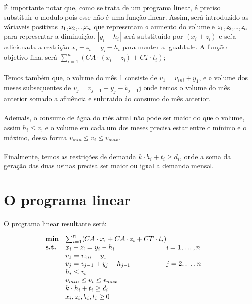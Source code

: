 \documentclass{article}
\begin{document}
\paragraph{} É importante notar que, como se trata de um programa linear, é preciso substituir o modulo pois esse não é uma função linear. Assim, será introduzido as váriaveis positivas $\emph{x}_1$,$\emph{x}_2$,\dots,$\emph{x}_n$ que representam o aumento do volume e $\emph{z}_1$,$\emph{z}_2$,\dots,$\emph{z}_n$ para representar a diminuição. \emph{$| y_{i} - h_{i} |$} será substituído por \emph{$(x_i + z_i)$} e seŕa adicionada a restrição \emph{$x_i - z_i = y_i - h_i$} para manter a igualdade. A função objetivo final será \emph{$\sum_{i=1}^{n} (CA \cdot (x_i + z_i) + CT \cdot t_{i})$};
\paragraph{} Temos também que, o volume do mês 1 consiste de \emph{$v_1 = v_{ini} + y_1$}, e o volume dos meses subsequentes de \emph{$v_j = v_{j-1} + y_j - h_{j-1}$}j onde temos o volume do mês anterior somado a afluência e subtraido do consumo do mês anterior. 
\paragraph{} Ademais, o consumo de água do mês atual não pode ser maior do que o volume, assim \emph{$h_i \le v_i$} e o volume em cada um dos meses precisa estar entre o mínimo e o máximo, dessa forma \emph{$v_{min} \le v_i \le v_{max}$}.
\paragraph{} Finalmente, temos as restrições de demanda \emph{$k \cdot h_i + t_i \ge d_i $}, onde a soma da geração das duas usinas precisa ser maior ou igual a demanda mensal.

\section{O programa linear}
\paragraph{} O programa linear resultante será:

\begin{equation*}
    \begin{array}{ll@{}ll}
        \textbf{min}  & \sum_{i=1}^{n} (CA \cdot x_i + CA \cdot z_i + CT \cdot t_{i}) &\\
        \textbf{s.t.} & x_i - z_i = y_i - h_i &i=1 ,\dots, n\\
                      & v_1 = v_{ini} + y_1 &\\ 
                      & v_j = v_{j-1} + y_j - h_{j-1} &j=2 ,\dots, n&\\
                      & h_i \le v_i &\\
                      & v_{min} \le v_i \le v_{max} &\\
                      & k \cdot h_i + t_i \ge d_i &\\
                      & x_i,z_i,h_i,t_i \ge 0
    \end{array}
\end{equation*}
\end{document}
